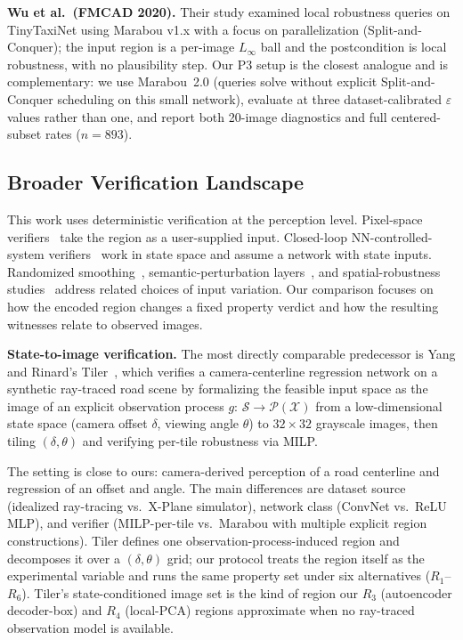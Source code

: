 \documentclass[twocolumn,smallextended,runningheads]{svjour3}
\begin{document}
\textbf{Wu et al.\ (FMCAD 2020).} Their study examined local robustness queries on TinyTaxiNet using Marabou v1.x with a focus on parallelization (Split-and-Conquer); the input region is a per-image $L_\infty$ ball and the postcondition is local robustness, with no plausibility step. Our P3 setup is the closest analogue and is complementary: we use Marabou~2.0 (queries solve without explicit Split-and-Conquer scheduling on this small network), evaluate at three dataset-calibrated $\varepsilon$ values rather than one, and report both 20-image diagnostics and full centered-subset rates ($n{=}893$).

\subsection{Broader Verification Landscape}

This work uses deterministic verification at the perception level. Pixel-space verifiers~\cite{liu2019algorithms,singh2019deeppoly,wang2021betacrown,bak2020nnenum} take the region as a user-supplied input. Closed-loop NN-controlled-system verifiers~\cite{tran2020nnv,ivanov2021verisig,julian2021reachability,ainncs2020} work in state space and assume a network with state inputs. Randomized smoothing~\cite{cohen2019smoothing}, semantic-perturbation layers~\cite{mohapatra2020semantify}, and spatial-robustness studies~\cite{engstrom2019spatial} address related choices of input variation. Our comparison focuses on how the encoded region changes a fixed property verdict and how the resulting witnesses relate to observed images.

\textbf{State-to-image verification.} The most directly comparable predecessor is Yang and Rinard's Tiler~\cite{yang2022tiler}, which verifies a camera-centerline regression network on a synthetic ray-traced road scene by formalizing the feasible input space as the image of an explicit observation process $g{:}\, \mathcal{S}{\to}\mathcal{P}(\mathcal{X})$ from a low-dimensional state space (camera offset $\delta$, viewing angle $\theta$) to $32{\times}32$ grayscale images, then tiling $(\delta,\theta)$ and verifying per-tile robustness via MILP.

The setting is close to ours: camera-derived perception of a road centerline and regression of an offset and angle. The main differences are dataset source (idealized ray-tracing vs.\ X-Plane simulator), network class (ConvNet vs.\ ReLU MLP), and verifier (MILP-per-tile vs.\ Marabou with multiple explicit region constructions). Tiler defines one observation-process-induced region and decomposes it over a $(\delta,\theta)$ grid; our protocol treats the region itself as the experimental variable and runs the same property set under six alternatives ($R_1$--$R_6$). Tiler's state-conditioned image set is the kind of region our $R_3$ (autoencoder decoder-box) and $R_4$ (local-PCA) regions approximate when no ray-traced observation model is available.
\end{document}
